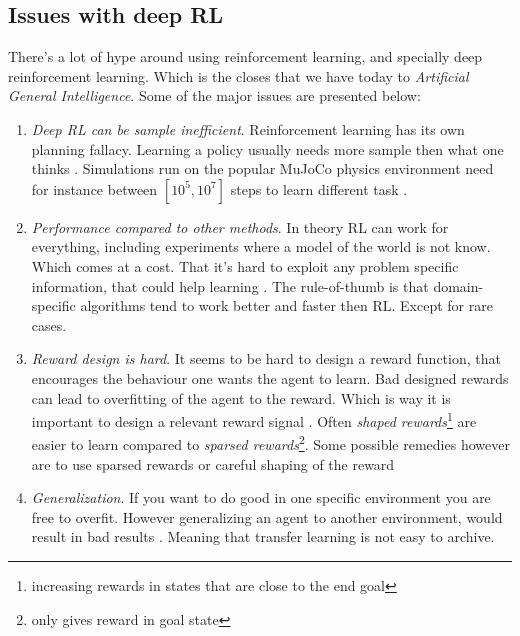 \documentclass{kththesis}
\theoremstyle{definition}
\begin{document}

\newpage

\subsection{Issues with deep RL}
There's a lot of hype around using reinforcement learning, and specially deep reinforcement learning. Which is the closes that we have today to \textit{Artificial General Intelligence}. Some of the major issues are presented below:

\begin{enumerate}
    \item \textit{Deep RL can be sample inefficient}. Reinforcement learning has its own planning fallacy. Learning a policy usually needs more sample then what one thinks \parencite{irpan_2018}. Simulations run on the popular MuJoCo physics environment need for instance between $[10^5, 10^7]$ steps to learn different task \parencite{heess2017emergence}.
    
    \item \textit{Performance compared to other methods}. In theory RL can work for everything, including experiments where a model of the world is not know. Which comes at a cost. That it's hard to exploit any problem specific information, that could help learning \parencite{irpan_2018}. The rule-of-thumb is that domain-specific algorithms tend to work better and faster then RL. Except for rare cases.
    
    \item \textit{Reward design is hard}. It seems to be hard to design a reward function, that encourages the behaviour one wants the agent to learn. Bad designed rewards can lead to overfitting of the agent to the reward. Which is way it is important to design a relevant reward signal \parencite{sutton1998reinforcement, irpan_2018}. Often \textit{shaped rewards}\footnote{increasing rewards in states that are close to the end goal} are easier to learn compared to \textit{sparsed rewards}\footnote{only gives reward in goal state}. Some possible remedies however are to use sparsed rewards or careful shaping of the reward \parencite{irpan_2018}
    
    \item \textit{Generalization}. If you want to do good in one specific environment you are free to overfit. However generalizing an agent to another environment, would result in bad results \parencite{irpan_2018}. Meaning that transfer learning is not easy to archive. 
    
\end{enumerate}
\end{document}
